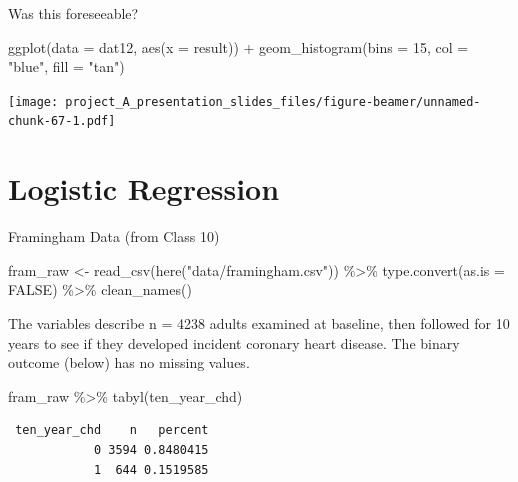 \documentclass[
  ignorenonframetext,
]{beamer}
\newenvironment{Shaded}{\begin{snugshade}}{\end{snugshade}}
\newcommand{\AttributeTok}[1]{\textcolor[rgb]{0.77,0.63,0.00}{#1}}
\newcommand{\ConstantTok}[1]{\textcolor[rgb]{0.00,0.00,0.00}{#1}}
\newcommand{\DecValTok}[1]{\textcolor[rgb]{0.00,0.00,0.81}{#1}}
\newcommand{\FunctionTok}[1]{\textcolor[rgb]{0.00,0.00,0.00}{#1}}
\newcommand{\NormalTok}[1]{#1}
\newcommand{\OtherTok}[1]{\textcolor[rgb]{0.56,0.35,0.01}{#1}}
\newcommand{\SpecialCharTok}[1]{\textcolor[rgb]{0.00,0.00,0.00}{#1}}
\newcommand{\StringTok}[1]{\textcolor[rgb]{0.31,0.60,0.02}{#1}}
\begin{document}
\begin{frame}[fragile]{Was this foreseeable?}
\protect\hypertarget{was-this-foreseeable}{}
\begin{Shaded}
\begin{Highlighting}[]
\FunctionTok{ggplot}\NormalTok{(}\AttributeTok{data =}\NormalTok{ dat12, }\FunctionTok{aes}\NormalTok{(}\AttributeTok{x =}\NormalTok{ result)) }\SpecialCharTok{+}
    \FunctionTok{geom\_histogram}\NormalTok{(}\AttributeTok{bins =} \DecValTok{15}\NormalTok{, }\AttributeTok{col =} \StringTok{"blue"}\NormalTok{, }\AttributeTok{fill =} \StringTok{"tan"}\NormalTok{)}
\end{Highlighting}
\end{Shaded}

\texttt{[image: project\_A\_presentation\_slides\_files/figure-beamer/unnamed-chunk-67-1.pdf]}
\end{frame}

\hypertarget{logistic-regression}{%
\section{Logistic Regression}\label{logistic-regression}}

\begin{frame}[fragile]{Framingham Data (from Class 10)}
\protect\hypertarget{framingham-data-from-class-10}{}
\begin{Shaded}
\begin{Highlighting}[]
\NormalTok{fram\_raw }\OtherTok{\textless{}{-}} \FunctionTok{read\_csv}\NormalTok{(}\FunctionTok{here}\NormalTok{(}\StringTok{"data/framingham.csv"}\NormalTok{)) }\SpecialCharTok{\%\textgreater{}\%}
    \FunctionTok{type.convert}\NormalTok{(}\AttributeTok{as.is =} \ConstantTok{FALSE}\NormalTok{) }\SpecialCharTok{\%\textgreater{}\%}
    \FunctionTok{clean\_names}\NormalTok{() }
\end{Highlighting}
\end{Shaded}

The variables describe n = 4238 adults examined at baseline, then
followed for 10 years to see if they developed incident coronary heart
disease. The binary outcome (below) has no missing values.

\begin{Shaded}
\begin{Highlighting}[]
\NormalTok{fram\_raw }\SpecialCharTok{\%\textgreater{}\%} \FunctionTok{tabyl}\NormalTok{(ten\_year\_chd)}
\end{Highlighting}
\end{Shaded}

\begin{verbatim}
 ten_year_chd    n   percent
            0 3594 0.8480415
            1  644 0.1519585
\end{verbatim}
\end{frame}
\end{document}
